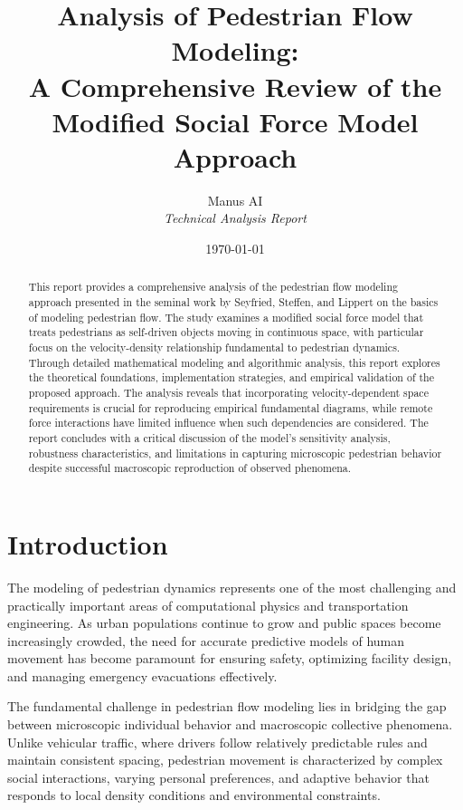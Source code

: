 \documentclass[12pt,a4paper]{article}
\title{\textbf{Analysis of Pedestrian Flow Modeling: \\
A Comprehensive Review of the Modified Social Force Model Approach}}
\author{Manus AI \\
\textit{Technical Analysis Report}}
\date{\today}
\begin{document}
\maketitle

\begin{abstract}
This report provides a comprehensive analysis of the pedestrian flow modeling approach presented in the seminal work by Seyfried, Steffen, and Lippert on the basics of modeling pedestrian flow. The study examines a modified social force model that treats pedestrians as self-driven objects moving in continuous space, with particular focus on the velocity-density relationship fundamental to pedestrian dynamics. Through detailed mathematical modeling and algorithmic analysis, this report explores the theoretical foundations, implementation strategies, and empirical validation of the proposed approach. The analysis reveals that incorporating velocity-dependent space requirements is crucial for reproducing empirical fundamental diagrams, while remote force interactions have limited influence when such dependencies are considered. The report concludes with a critical discussion of the model's sensitivity analysis, robustness characteristics, and limitations in capturing microscopic pedestrian behavior despite successful macroscopic reproduction of observed phenomena.
\end{abstract}

\newpage
\tableofcontents
\newpage

\section{Introduction}

The modeling of pedestrian dynamics represents one of the most challenging and practically important areas of computational physics and transportation engineering. As urban populations continue to grow and public spaces become increasingly crowded, the need for accurate predictive models of human movement has become paramount for ensuring safety, optimizing facility design, and managing emergency evacuations effectively.

The fundamental challenge in pedestrian flow modeling lies in bridging the gap between microscopic individual behavior and macroscopic collective phenomena. Unlike vehicular traffic, where drivers follow relatively predictable rules and maintain consistent spacing, pedestrian movement is characterized by complex social interactions, varying personal preferences, and adaptive behavior that responds to local density conditions and environmental constraints.
\end{document}

